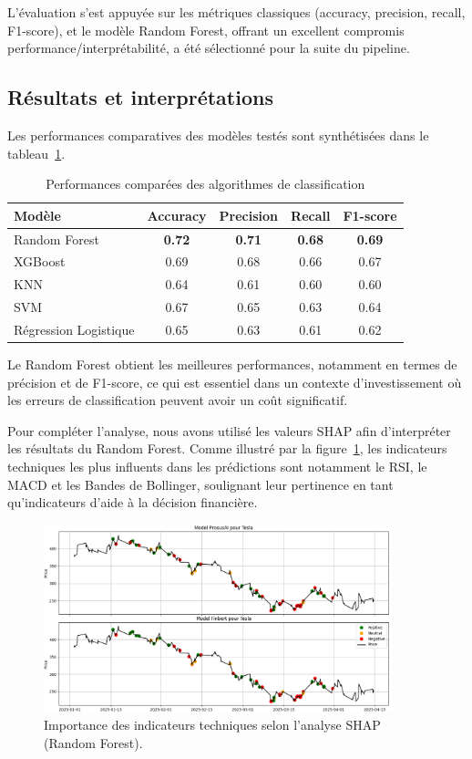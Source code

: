 \documentclass[a4paper,12pt]{article}
\begin{document}
L'évaluation s'est appuyée sur les métriques classiques (accuracy, precision, recall, F1-score), et le modèle Random Forest, offrant un excellent compromis performance/interprétabilité, a été sélectionné pour la suite du pipeline.

\subsection*{Résultats et interprétations}

Les performances comparatives des modèles testés sont synthétisées dans le tableau~\ref{tab:classification_performance}.

\begin{table}[h!]
\centering
\begin{tabular}{|l|c|c|c|c|}
\hline
\textbf{Modèle} & \textbf{Accuracy} & \textbf{Precision} & \textbf{Recall} & \textbf{F1-score}\\
\hline
Random Forest & \textbf{0.72} & \textbf{0.71} & \textbf{0.68} & \textbf{0.69}\\
XGBoost & 0.69 & 0.68 & 0.66 & 0.67\\
KNN & 0.64 & 0.61 & 0.60 & 0.60\\
SVM & 0.67 & 0.65 & 0.63 & 0.64\\
Régression Logistique & 0.65 & 0.63 & 0.61 & 0.62\\
\hline
\end{tabular}
\caption{Performances comparées des algorithmes de classification}
\label{tab:classification_performance}
\end{table}

Le Random Forest obtient les meilleures performances, notamment en termes de précision et de F1-score, ce qui est essentiel dans un contexte d’investissement où les erreurs de classification peuvent avoir un coût significatif.

Pour compléter l’analyse, nous avons utilisé les valeurs SHAP afin d’interpréter les résultats du Random Forest. Comme illustré par la figure~\ref{fig:shap_classification}, les indicateurs techniques les plus influents dans les prédictions sont notamment le RSI, le MACD et les Bandes de Bollinger, soulignant leur pertinence en tant qu'indicateurs d'aide à la décision financière.

\begin{figure}[h!]
    \centering
    \includegraphics[width=0.9\textwidth]{Model Comparison.png}
    \caption{Importance des indicateurs techniques selon l'analyse SHAP (Random Forest).}
    \label{fig:shap_classification}
\end{figure}
\end{document}
